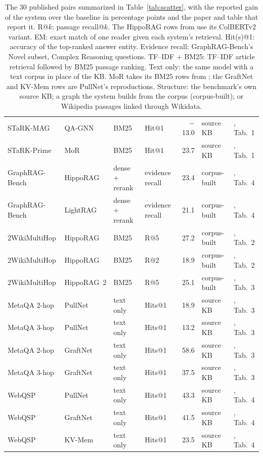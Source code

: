 \documentclass[11pt]{article}
\begin{document}
\begin{table}[tp]
{\begin{tabular}{llllrll}
STaRK-MAG & QA-GNN & BM25 & Hit@1 & $-$13.0 & source KB & \citealp{lei2025mor}, Tab.~1\\
STaRK-Prime & MoR & BM25 & Hit@1 & 23.7 & source KB & \citealp{lei2025mor}, Tab.~1\\
GraphRAG-Bench & HippoRAG & dense + rerank & evidence recall & 23.4 & corpus-built & \citealp{graphragbench2025}, Tab.~4\\
GraphRAG-Bench & LightRAG & dense + rerank & evidence recall & 21.1 & corpus-built & \citealp{graphragbench2025}, Tab.~4\\
2WikiMultiHop & HippoRAG & BM25 & R@5 & 27.2 & corpus-built & \citealp{gutierrez2024hipporag}, Tab.~2\\
2WikiMultiHop & HippoRAG & BM25 & R@2 & 18.9 & corpus-built & \citealp{gutierrez2024hipporag}, Tab.~2\\
2WikiMultiHop & HippoRAG~2 & BM25 & R@5 & 25.1 & corpus-built & \citealp{gutierrez2025hipporag2}, Tab.~3\\
MetaQA 2-hop & PullNet & text only & Hits@1 & 18.9 & source KB & \citealp{sun2019pullnet}, Tab.~3\\
MetaQA 3-hop & PullNet & text only & Hits@1 & 13.2 & source KB & \citealp{sun2019pullnet}, Tab.~3\\
MetaQA 2-hop & GraftNet & text only & Hits@1 & 58.6 & source KB & \citealp{sun2019pullnet}, Tab.~3\\
MetaQA 3-hop & GraftNet & text only & Hits@1 & 37.5 & source KB & \citealp{sun2019pullnet}, Tab.~3\\
WebQSP & PullNet & text only & Hits@1 & 43.3 & source KB & \citealp{sun2019pullnet}, Tab.~4\\
WebQSP & GraftNet & text only & Hits@1 & 41.5 & source KB & \citealp{sun2019pullnet}, Tab.~4\\
WebQSP & KV-Mem & text only & Hits@1 & 23.5 & source KB & \citealp{sun2019pullnet}, Tab.~4\\
\bottomrule
\end{tabular}}
\caption{The $30$ published pairs summarized in Table~\ref{tab:scatter}, with the reported gain of the system over the baseline in percentage points and the paper and table that report it. R@$k$: passage recall@$k$. The HippoRAG rows from \citet{gutierrez2024hipporag} use its ColBERTv2 variant. EM: exact match of one reader given each system's retrieval. Hit(s)@1: accuracy of the top-ranked answer entity. Evidence recall: GraphRAG-Bench's Novel subset, Complex Reasoning questions. TF--IDF + BM25: TF--IDF article retrieval followed by BM25 passage ranking. Text only: the same model with a text corpus in place of the KB. MoR takes its BM25 rows from \citet{wu2024stark}; the GraftNet and KV-Mem rows are PullNet's reproductions. Structure: the benchmark's own source KB; a graph the system builds from the corpus (corpus-built); or Wikipedia passages linked through Wikidata.}
\label{tab:pairs}
\end{table}
\end{document}
